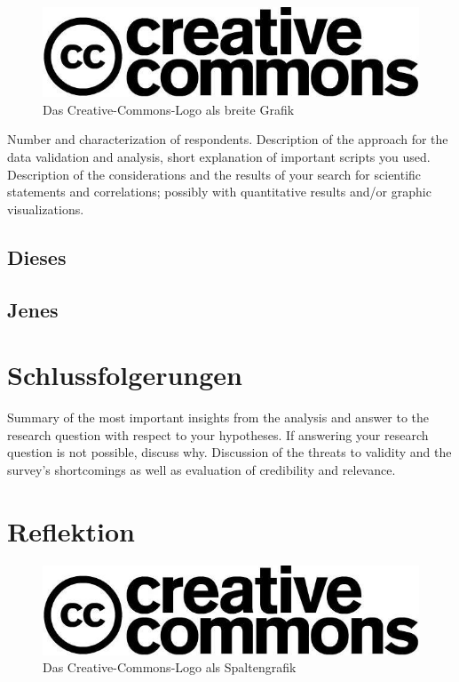 \documentclass[de]{agse-empir-report}\usepackage[]{graphicx}\usepackage[]{color}
\begin{document}
\begin{figure}
    \includegraphics[width=\linewidth]{creative_commons.jpg}
    \caption{Das Creative-Commons-Logo als breite Grafik}
\end{figure}

Number and characterization of respondents.
Description of the approach for the data validation and
analysis, short explanation of important scripts you used.
Description of the considerations and the results of your search for
scientific statements and correlations; possibly with quantitative
results and/or graphic visualizations.

\lipsum[5]


\subsection{Dieses}
\lipsum[6]


\subsection[mds]{Jenes}
\lipsum[7-8]


\section[hs]{Schlussfolgerungen}
Summary of the most important insights from the analysis and
answer to the research question with respect to your hypotheses.
If answering your research question is not possible, discuss why.
Discussion of the threats to validity and the survey's
shortcomings as well as evaluation of credibility and relevance.

\lipsum[9-10]


\section[kk]{Reflektion}

\begin{figure}
    \includegraphics[width=\linewidth]{creative_commons.jpg}
    \caption{Das Creative-Commons-Logo als Spaltengrafik}
\end{figure}
\end{document}

